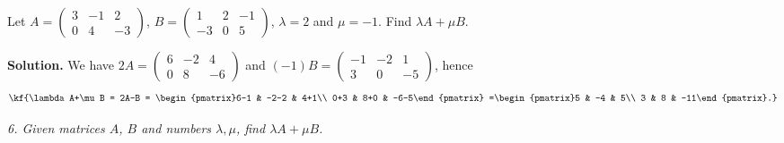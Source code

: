 \begin{misol}
 Let $A=\begin{pmatrix}3 & -1 & 2\\ 0 & 4 & -3\end{pmatrix}$,
$B=\begin{pmatrix}1 & 2 & -1\\ -3 & 0 & 5\end{pmatrix}$, $\lambda=2$ and $\mu=-1$. Find $\lambda A+\mu B$.

\textbf{Solution.}
We have
$2A=\begin{pmatrix}6 & -2 & 4\\ 0 & 8 & -6\end{pmatrix}$ and
$(-1)B=\begin{pmatrix}-1 & -2 & 1\\ 3 & 0 & -5\end{pmatrix}$, hence
\[\kf{\lambda A+\mu B = 2A-B = \begin{pmatrix}6-1 & -2-2 & 4+1\\ 0+3 & 8+0 & -6-5\end{pmatrix}
=\begin{pmatrix}5 & -4 & 5\\ 3 & 8 & -11\end{pmatrix}.}\]
\end{misol}
\emph{6. Given matrices $A$, $B$ and numbers $\lambda, \mu$, find $\lambda A + \mu B$.}
\bigskip
